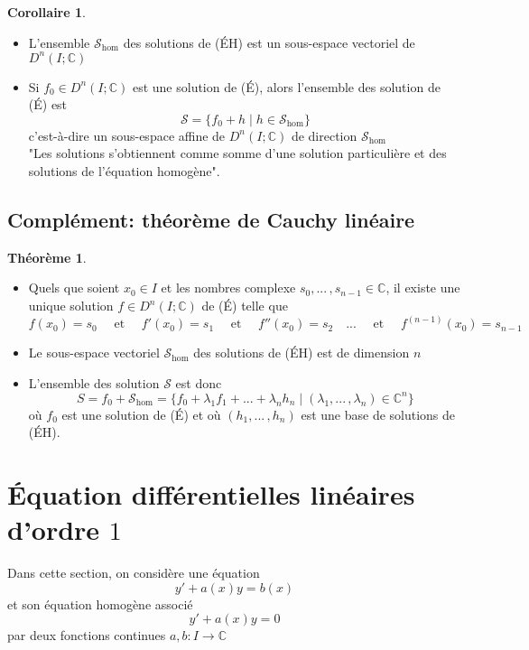 \documentclass[10pt,a4paper]{article}
\theoremstyle{definition}
\newtheorem{theorem}[proposition]{Théorème}
\newtheorem{corollaire}[proposition]{Corollaire}
\begin{document}
\begin{corollaire}
\hfill
\begin{itemize}
\item L'ensemble $\mathcal{S}_\text{hom}$ des solutions de (ÉH) est un sous-espace vectoriel de $D^n(I; \mathbb{C})$
\item Si $f_0 \in D^n(I; \mathbb{C})$ est une solution de (É), alors l'ensemble des solution de (É) est
\[ \mathcal{S} = \{ f_0 + h \mid h \in \mathcal{S}_\text{hom}\} \]
c'est-à-dire un sous-espace affine de $D^n(I; \mathbb{C})$ de direction $\mathcal{S}_\text{hom}$ \\
"Les solutions s'obtiennent comme somme d'une solution particulière et des solutions de l'équation homogène".
\end{itemize}
\end{corollaire}

\subsection{Complément: théorème de Cauchy linéaire}
\begin{theorem}
\hfill
\begin{itemize}
\item Quels que soient $x_0 \in I$ et les nombres complexe $s_0, ...\,, s_{n - 1} \in \mathbb{C}$, il existe une unique solution $f \in D^n(I; \mathbb{C})$ de (É) telle que
\[ f(x_0) = s_0 \quad  \text{ et } \quad f'(x_0) = s_1 \quad \text{ et } \quad f''(x_0) = s_2 \quad ... \quad \text{ et } \quad f^{(n - 1)}(x_0) = s_{n - 1} \]
\item Le sous-espace vectoriel $\mathcal{S}_\text{hom}$ des solutions de (ÉH) est de dimension $n$
\item L'ensemble des solution $\mathcal{S}$ est donc
\[ S = f_0 + \mathcal{S}_\text{hom} = \{ f_0 + \lambda_1 f_1 + ... + \lambda_n h_n \mid (\lambda_1, ...\,, \lambda_n) \in \mathbb{C}^n \} \]
où $f_0$ est une solution de (É) et où $(h_1, ...\,, h_n)$ est une base de solutions de (ÉH).
\end{itemize}
\end{theorem}

\section{Équation différentielles linéaires d'ordre $1$}
\noindent Dans cette section, on considère une équation
\[ y' + a(x)y = b(x) \tag{É} \]
et son équation homogène associé
\[ y' + a(x)y = 0 \tag{ÉH} \]
par deux fonctions continues $a, b: I \to \mathbb{C}$
\end{document}
